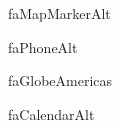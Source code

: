
\makeatletter
\ifcsname faMapMarkerAlt\endcsname
  \let\faMapMarker\faMapMarkerAlt
  \renewcommand{\cvLocationMarker}{\faMapMarkerAlt}
\fi

\ifcsname faPhoneAlt\endcsname
  \let\faPhone\faPhoneAlt
\fi

\ifcsname faGlobeAmericas\endcsname
  \let\faGlobe\faGlobeAmericas
\fi

\ifcsname faCalendarAlt\endcsname
  \renewcommand{\cvDateMarker}{\faCalendarAlt}
\fi
\makeatother